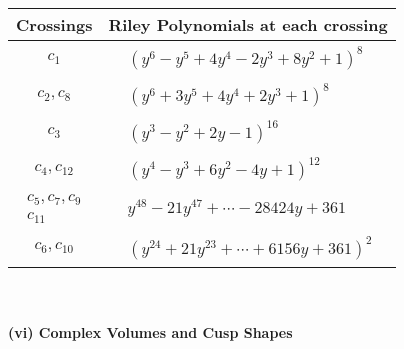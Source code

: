 \documentclass[1p]{elsarticle_modified}
\theoremstyle{definition}
\begin{document}
\begin{tabular}{m{50pt}|m{274pt}}
Crossings & \hspace{64pt}Riley Polynomials at each crossing \\
\hline $$\begin{aligned}c_{1}\end{aligned}$$&$\begin{aligned}
&(y^6- y^5+4 y^4-2 y^3+8 y^2+1)^8
\end{aligned}$\\
\hline $$\begin{aligned}c_{2},c_{8}\end{aligned}$$&$\begin{aligned}
&(y^6+3 y^5+4 y^4+2 y^3+1)^8
\end{aligned}$\\
\hline $$\begin{aligned}c_{3}\end{aligned}$$&$\begin{aligned}
&(y^3- y^2+2 y-1)^{16}
\end{aligned}$\\
\hline $$\begin{aligned}c_{4},c_{12}\end{aligned}$$&$\begin{aligned}
&(y^4- y^3+6 y^2-4 y+1)^{12}
\end{aligned}$\\
\hline $$\begin{aligned}c_{5},c_{7},c_{9}\\c_{11}\end{aligned}$$&$\begin{aligned}
&y^{48}-21 y^{47}+\cdots-28424 y+361
\end{aligned}$\\
\hline $$\begin{aligned}c_{6},c_{10}\end{aligned}$$&$\begin{aligned}
&(y^{24}+21 y^{23}+\cdots+6156 y+361)^{2}
\end{aligned}$\\
\hline
\end{tabular}\\~\\
\newpage\flushleft \textbf{(vi) Complex Volumes and Cusp Shapes}
\end{document}
